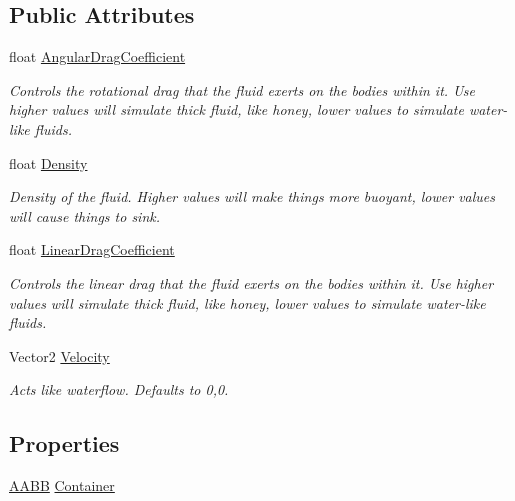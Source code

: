\subsection*{Public Attributes}
\begin{DoxyCompactItemize}
\item 
float \hyperlink{class_farseer_physics_1_1_controllers_1_1_buoyancy_controller_a4c3b651c041cb3c9abdb972e6833e9d0}{Angular\+Drag\+Coefficient}
\begin{DoxyCompactList}\small\item\em Controls the rotational drag that the fluid exerts on the bodies within it. Use higher values will simulate thick fluid, like honey, lower values to simulate water-\/like fluids. \end{DoxyCompactList}\item 
float \hyperlink{class_farseer_physics_1_1_controllers_1_1_buoyancy_controller_a57ba9c3aa147b770dd411f209ba92a6e}{Density}
\begin{DoxyCompactList}\small\item\em Density of the fluid. Higher values will make things more buoyant, lower values will cause things to sink. \end{DoxyCompactList}\item 
float \hyperlink{class_farseer_physics_1_1_controllers_1_1_buoyancy_controller_a2df8072945d7c6154e0bcc1c84052117}{Linear\+Drag\+Coefficient}
\begin{DoxyCompactList}\small\item\em Controls the linear drag that the fluid exerts on the bodies within it. Use higher values will simulate thick fluid, like honey, lower values to simulate water-\/like fluids. \end{DoxyCompactList}\item 
Vector2 \hyperlink{class_farseer_physics_1_1_controllers_1_1_buoyancy_controller_ab04dfa65ec34fdd8f0c31aadd5423417}{Velocity}
\begin{DoxyCompactList}\small\item\em Acts like waterflow. Defaults to 0,0. \end{DoxyCompactList}\end{DoxyCompactItemize}
\subsection*{Properties}
\begin{DoxyCompactItemize}
\item 
\hyperlink{struct_farseer_physics_1_1_collision_1_1_a_a_b_b}{A\+A\+B\+B} \hyperlink{class_farseer_physics_1_1_controllers_1_1_buoyancy_controller_aab8b52db8eb3243c56ce5e2a0b525f58}{Container}
\end{DoxyCompactItemize}


